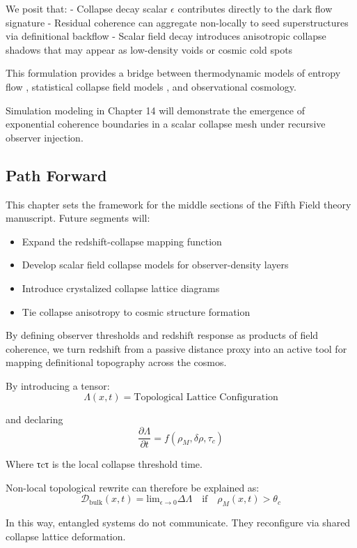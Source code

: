 We posit that:
- Collapse decay scalar \( \epsilon \) contributes directly to the dark flow signature
- Residual coherence can aggregate non-locally to seed superstructures via definitional backflow
- Scalar field decay introduces anisotropic collapse shadows that may appear as low-density voids or cosmic cold spots

This formulation provides a bridge between thermodynamic models of entropy flow \cite{quantum_thermo_laws}, statistical collapse field models \cite{thermalization_dynamics}, and observational cosmology.

Simulation modeling in Chapter 14 will demonstrate the emergence of exponential coherence boundaries in a scalar collapse mesh under recursive observer injection.



\subsection{Path Forward}\cite{emergent_field_core, entanglement_structure, quantum_thermo_laws, thermalization_dynamics, blackhole_collapse_links}
This chapter sets the framework for the middle sections of the Fifth Field theory manuscript. Future segments will:
\begin{itemize}
  \item Expand the redshift-collapse mapping function
  \item Develop scalar field collapse models for observer-density layers
  \item Introduce crystalized collapse lattice diagrams
  \item Tie collapse anisotropy to cosmic structure formation
\end{itemize}

By defining observer thresholds and redshift response as products of field coherence, we turn redshift from a passive distance proxy into an active tool for mapping definitional topography across the cosmos.

By introducing a tensor:
\[\Lambda(x,t) = \text{Topological Lattice Configuration}\]

and declaring 
\[\frac{\partial \Lambda}{\partial t} = f(\rho_M, \delta \rho, \tau_c)\]

Where τcτ is the local collapse threshold time.

Non-local topological rewrite can therefore be explained as:
\[\mathcal{D}_\text{bulk}(x, t) = \text{lim}_{\epsilon \to 0} \Delta \Lambda \quad \text{if} \quad \rho_M(x,t) > \theta_c\]

In this way, entangled systems do not communicate. They reconfigure via shared collapse lattice deformation.


\printbibliography[title={Appendix E References}, keyword=chapter5]
